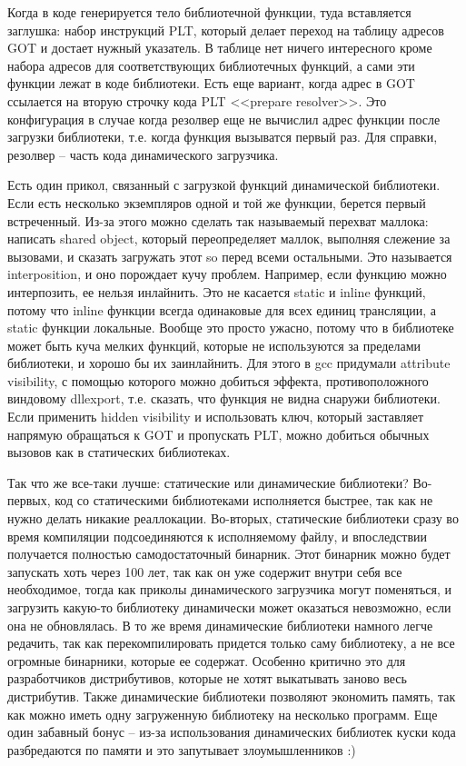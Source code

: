 \documentclass[12pt, a4paper]{article}
\begin{document}
Когда в коде генерируется тело библиотечной функции, туда вставляется заглушка: набор инструкций PLT, который делает переход на таблицу адресов GOT и достает нужный указатель. В таблице нет ничего интересного кроме набора адресов для соответствующих библиотечных функций, а сами эти функции лежат в коде библиотеки. Есть еще вариант, когда адрес в GOT ссылается на вторую строчку кода PLT <<prepare resolver>>. Это конфигурация в случае когда резолвер еще не вычислил адрес функции после загрузки библиотеки, т.е. когда функция вызыватся первый раз. Для справки, резолвер -- часть кода динамического загрузчика.\\
\par Есть один прикол, связанный с загрузкой функций динамической библиотеки. Если есть несколько экземпляров одной и той же функции, берется первый встреченный. Из-за этого можно сделать так называемый перехват маллока: написать shared object, который переопределяет маллок, выполняя слежение за вызовами, и сказать загружать этот so перед всеми остальными. Это называется interposition, и оно порождает кучу проблем. Например, если функцию можно интерпозить, ее нельзя инлайнить. Это не касается static и inline функций, потому что inline функции всегда одинаковые для всех единиц трансляции, а static функции локальные. Вообще это просто ужасно, потому что в библиотеке может быть куча мелких функций, которые не используются за пределами библиотеки, и хорошо бы их заинлайнить. Для этого в gcc придумали attribute visibility, с помощью которого можно добиться эффекта, противоположного виндовому dllexport, т.е. сказать, что функция не видна снаружи библиотеки. Если применить hidden visibility и использовать ключ, который заставляет напрямую обращаться к GOT и пропускать PLT, можно добиться обычных вызовов как в статических библиотеках.\\
\par Так что же все-таки лучше: статические или динамические библиотеки? Во-первых, код со статическими библиотеками исполняется быстрее, так как не нужно делать никакие реаллокации. Во-вторых, статические библиотеки сразу во время компиляции подсоединяются к исполняемому файлу, и впоследствии получается полностью самодостаточный бинарник. Этот бинарник можно будет запускать хоть через 100 лет, так как он уже содержит внутри себя все необходимое, тогда как приколы динамического загрузчика могут поменяться, и загрузить какую-то библиотеку динамически может оказаться невозможно, если она не обновлялась. В то же время динамические библиотеки намного легче редачить, так как перекомпилировать придется только саму библиотеку, а не все огромные бинарники, которые ее содержат. Особенно критично это для разработчиков дистрибутивов, которые не хотят выкатывать заново весь дистрибутив. Также динамические библиотеки позволяют экономить память, так как можно иметь одну загруженную библиотеку на несколько программ. Еще один забавный бонус -- из-за использования динамических библиотек куски кода разбредаются по памяти и это запутывает злоумышленников :)
\end{document}
